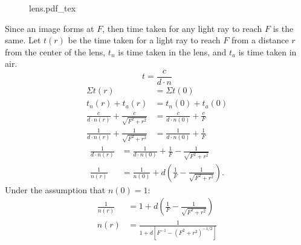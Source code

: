 \documentclass{article}
\newcommand{\incfig}[2][1]{%
    \def\svgwidth{#1\columnwidth}
    {#2.pdf_tex}
}
\begin{document}
\begin{enumerate}
\begin{enumerate}
        \begin{figure}[ht]
          \centering
          \incfig{lens}
          \caption{}
          \label{fig:lens}
        \end{figure}
        Since an image forms at $F$, then time taken for any light ray to reach $F$
        is the same. Let $t(r)$ be the time taken for a light ray to reach $F$ from
        a distance $r$ from the center of the lens, $t_n$ is time taken in the lens,
        and $t_a$ is time taken in air.
        \begin{equation}
          t=\frac{c}{d\cdot n}
        \end{equation}
        \begin{align}
          \Sigma t(r) &= \Sigma t(0) \\
          t_n(r) + t_a(r) &= t_n(0) + t_{a}(0) \\
          \frac{c}{d\cdot n(r)}+\frac{c}{\sqrt{F^2+r^2} }&= \frac{c}{d\cdot n(0)}+\frac{c}{F} \\
          \frac{1}{d\cdot n(r)}+\frac{1}{\sqrt{F^2+r^2} }&= \frac{1}{d\cdot n(0)}+\frac{1}{F}
        \end{align}
        \begin{align}
          \frac{1}{d\cdot n(r)}&= \frac{1}{d\cdot n(0)}+\frac{1}{F}-\frac{1}{\sqrt{F^2+r^2} } \\
          \frac{1}{n(r)}&= \frac{1}{n(0)}+d\left( \frac{1}{F}-\frac{1}{\sqrt{F^2+r^2} } \right)
        .\end{align}
        Under the assumption that $n(0)=1$:
        \begin{align}
          \frac{1}{n(r)} &= 1+d\left( \frac{1}{F}-\frac{1}{\sqrt{F^2+r^2} } \right)\\
          n(r) &= \frac{1}{1+d\left[F^{-1}-( F^2+r^2 )^{-1/2} \right] }
        \end{align}
    \end{enumerate}

    \newpage


\end{enumerate}
\end{document}
